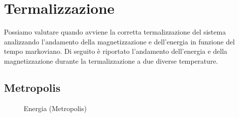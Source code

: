 \section{Termalizzazione}
Possiamo valutare quando avviene la corretta termalizzazione del sistema analizzando l'andamento della magnetizzazione e dell'energia in funzione del tempo markoviano.
Di seguito è riportato l'andamento dell'energia e della magnetizzazione durante la termalizzazione a due diverse temperature.
\subsection*{Metropolis}
\begin{figure}[h]
\caption{Energia (Metropolis)}
\end{figure}
